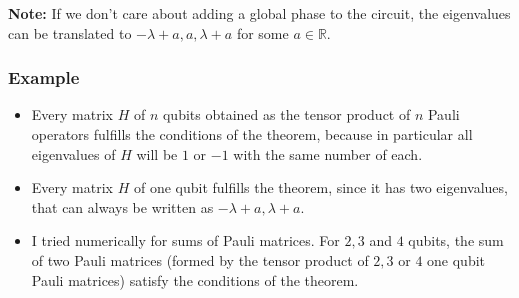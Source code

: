 \textbf{Note:} If we don't care about adding a global phase to the circuit, the eigenvalues can be translated to $-\lambda+a, a, \lambda+a$ for some $a\in \mathbb{R}$.\\

\subsubsection{Example}
\begin{itemize}
\item  Every matrix $H$ of $n$ qubits obtained as the
tensor product of $n$ Pauli operators fulfills the conditions of the theorem, 
because in particular all eigenvalues of $H$ will
be $1$ or $-1$ with the same number of each. 
\item Every matrix $H$ of one qubit fulfills the theorem, since it has two eigenvalues, that can always be written as $-\lambda+a, \lambda+a$.
\item I tried numerically for sums of Pauli matrices. For $2,3$ and $4$ qubits, the sum of two Pauli matrices (formed by the tensor product of $2,3$ or $4$ one qubit Pauli matrices) satisfy the conditions of the theorem.\\
\end{itemize}


